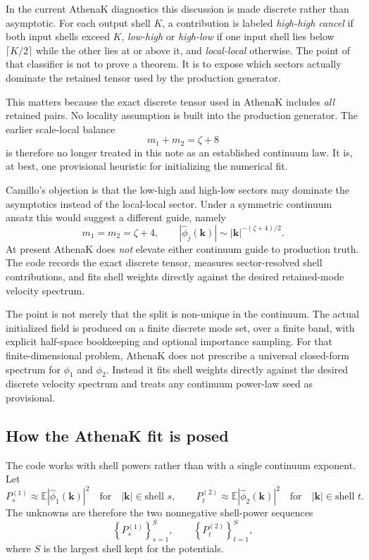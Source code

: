 \documentclass[11pt]{article}
\newcommand{\E}{\mathbb{E}}
\newcommand{\kk}{\mathbf{k}}
\begin{document}
In the current AthenaK diagnostics this discussion is made discrete rather than asymptotic. For each output shell $K$, a contribution is labeled \emph{high-high cancel} if both input shells exceed $K$, \emph{low-high} or \emph{high-low} if one input shell lies below $\lceil K/2\rceil$ while the other lies at or above it, and \emph{local-local} otherwise. The point of that classifier is not to prove a theorem. It is to expose which sectors actually dominate the retained tensor used by the production generator.

This matters because the exact discrete tensor used in AthenaK includes \emph{all} retained pairs. No locality assumption is built into the production generator. The earlier scale-local balance
\[
m_1+m_2=\zeta+8
\]
is therefore no longer treated in this note as an established continuum law. It is, at best, one provisional heuristic for initializing the numerical fit.

Camillo's objection is that the low-high and high-low sectors may dominate the asymptotics instead of the local-local sector. Under a symmetric continuum ansatz this would suggest a different guide, namely
\[
m_1=m_2=\zeta+4,
\qquad
|\hat{\phi}_j(\kk)| \sim |\kk|^{-(\zeta+4)/2}.
\]
At present AthenaK does \emph{not} elevate either continuum guide to production truth. The code records the exact discrete tensor, measures sector-resolved shell contributions, and fits shell weights directly against the desired retained-mode velocity spectrum.

The point is not merely that the split is non-unique in the continuum. The actual initialized field is produced on a finite discrete mode set, over a finite band, with explicit half-space bookkeeping and optional importance sampling. For that finite-dimensional problem, AthenaK does not prescribe a universal closed-form spectrum for $\phi_1$ and $\phi_2$. Instead it fits shell weights directly against the desired discrete velocity spectrum and treats any continuum power-law seed as provisional.

\subsection{How the AthenaK fit is posed}
The code works with shell powers rather than with a single continuum exponent. Let
\begin{equation}
P_s^{(1)} \approx \E |\hat{\phi}_1(\kk)|^2
\quad\text{for}\quad |\kk|\in \text{shell } s,
\qquad
P_t^{(2)} \approx \E |\hat{\phi}_2(\kk)|^2
\quad\text{for}\quad |\kk|\in \text{shell } t.
\end{equation}
The unknowns are therefore the two nonnegative shell-power sequences
\begin{equation}
\left\{P_s^{(1)}\right\}_{s=1}^{S},
\qquad
\left\{P_t^{(2)}\right\}_{t=1}^{S},
\end{equation}
where $S$ is the largest shell kept for the potentials.
\end{document}
